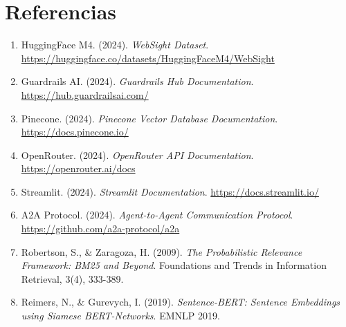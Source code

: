 \documentclass[12pt,a4paper]{article}
\begin{document}
\section{Referencias}

\begin{enumerate}
    \item HuggingFace M4. (2024). \textit{WebSight Dataset}. \url{https://huggingface.co/datasets/HuggingFaceM4/WebSight}
    
    \item Guardrails AI. (2024). \textit{Guardrails Hub Documentation}. \url{https://hub.guardrailsai.com/}
    
    \item Pinecone. (2024). \textit{Pinecone Vector Database Documentation}. \url{https://docs.pinecone.io/}
    
    \item OpenRouter. (2024). \textit{OpenRouter API Documentation}. \url{https://openrouter.ai/docs}
    
    \item Streamlit. (2024). \textit{Streamlit Documentation}. \url{https://docs.streamlit.io/}
    
    \item A2A Protocol. (2024). \textit{Agent-to-Agent Communication Protocol}. \url{https://github.com/a2a-protocol/a2a}
    
    \item Robertson, S., \& Zaragoza, H. (2009). \textit{The Probabilistic Relevance Framework: BM25 and Beyond}. Foundations and Trends in Information Retrieval, 3(4), 333-389.
    
    \item Reimers, N., \& Gurevych, I. (2019). \textit{Sentence-BERT: Sentence Embeddings using Siamese BERT-Networks}. EMNLP 2019.
\end{enumerate}
\end{document}
